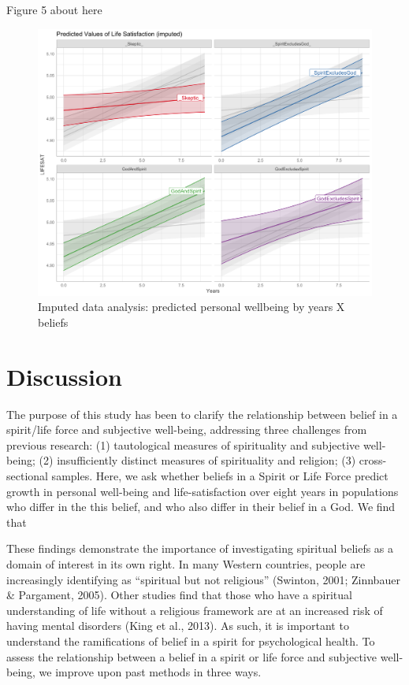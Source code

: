 \documentclass[
  english,
  man]{apa6}
\begin{document}
Figure 5 about here

\begin{figure}
\includegraphics[width=6.4in]{Figs/predicted_lifesat_imputed-1} \caption{Imputed data analysis: predicted personal wellbeing by years X beliefs}\label{fig:unnamed-chunk-6}
\end{figure}

\hypertarget{discussion}{%
\section{Discussion}\label{discussion}}

The purpose of this study has been to clarify the relationship between belief in a spirit/life force and subjective well-being, addressing three challenges from previous research: (1) tautological measures of spirituality and subjective well-being; (2) insufficiently distinct measures of spirituality and religion; (3) cross-sectional samples. Here, we ask whether beliefs in a Spirit or Life Force predict growth in personal well-being and life-satisfaction over eight years in populations who differ in the this belief, and who also differ in their belief in a God. We find that

These findings demonstrate the importance of investigating spiritual beliefs as a domain of interest in its own right. In many Western countries, people are increasingly identifying as \enquote{spiritual but not religious} (Swinton, 2001; Zinnbauer \& Pargament, 2005). Other studies find that those who have a spiritual understanding of life without a religious framework are at an increased risk of having mental disorders (King et al., 2013). As such, it is important to understand the ramifications of belief in a spirit for psychological health.
To assess the relationship between a belief in a spirit or life force and subjective well-being, we improve upon past methods in three ways.
\end{document}
